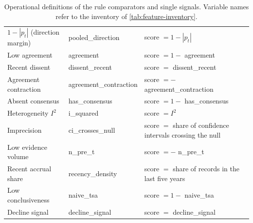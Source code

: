 \documentclass[11pt]{article}
\begin{document}
\begin{table}[!t]
\begin{tabular}{@{}p{}p{}p{}@{}}
$1-|p_t|$ (direction margin) & pooled\_direction & score $=1-|p_t|$ \\
Low agreement & agreement & score $=1-$ agreement \\
Recent dissent & dissent\_recent & score $=$ dissent\_recent \\
Agreement contraction & agreement\_contraction & score $=-$ agreement\_contraction \\
Absent consensus & has\_consensus & score $=1-$ has\_consensus \\
Heterogeneity $I^2$ & i\_squared & score $=I^2$ \\
Imprecision & ci\_crosses\_null & score $=$ share of confidence intervals crossing the null \\
Low evidence volume & n\_pre\_t & score $=-$ n\_pre\_t \\
Recent accrual share & recency\_density & score $=$ share of records in the last five years \\
Low conclusiveness & naive\_tsa & score $=1-$ naive\_tsa \\
Decline signal & decline\_signal & score $=$ decline\_signal \\
\bottomrule
\end{tabular}
\caption{Operational definitions of the rule comparators and single signals. Variable names refer
to the inventory of \cref{tab:feature-inventory}.}
\label{tab:appops}
\end{table}
\end{document}
